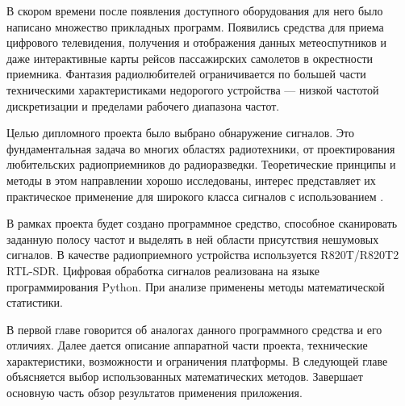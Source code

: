 В скором времени после появления доступного оборудования для него было написано множество прикладных программ. Появились средства для приема цифрового телевидения, получения и отображения данных метеоспутников и даже интерактивные карты рейсов пассажирских самолетов в окрестности приемника. Фантазия радиолюбителей ограничивается по большей части техническими характеристиками недорогого устройства --- низкой частотой дискретизации и пределами рабочего диапазона частот.

Целью дипломного проекта было выбрано обнаружение сигналов. Это фундаментальная задача во многих областях радиотехники, от проектирования любительских радиоприемников до радиоразведки. Теоретические принципы и методы в этом направлении хорошо исследованы, интерес представляет их практическое применение для широкого класса сигналов с использованием \sdr.

В рамках проекта будет создано программное средство, способное сканировать заданную полосу частот и выделять в ней области присутствия нешумовых сигналов. В качестве радиоприемного устройства используется R820T/R820T2 RTL-SDR. Цифровая обработка сигналов реализована на языке программирования Python. При анализе применены методы математической статистики.

В первой главе говорится об аналогах данного программного средства и его отличиях. Далее дается описание аппаратной части проекта, технические характеристики, возможности и ограничения платформы. В следующей главе объясняется выбор использованных математических методов. Завершает основную часть обзор результатов применения приложения.
